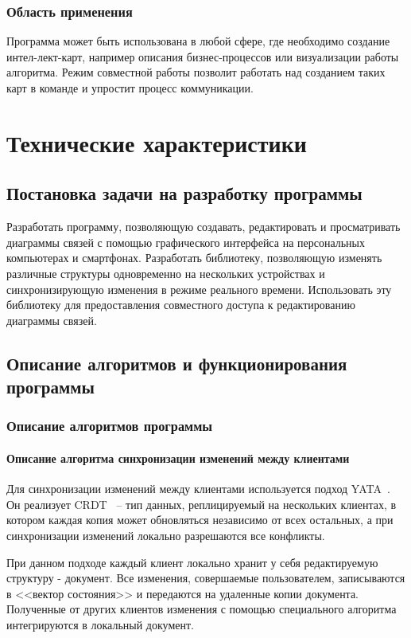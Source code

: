 \documentclass[a4paper,12pt]{article}
\begin{document}
    \subsubsection{Область применения}
    Программа может быть использована в любой сфере, где необходимо создание интел-лект-карт, например описания бизнес-процессов или визуализации работы алгоритма. Режим совместной работы позволит работать над созданием таких карт в команде и упростит процесс коммуникации.
    \newpage


    \section{Технические характеристики}

    \subsection{Постановка задачи на разработку программы}
    Разработать программу, позволяющую создавать, редактировать и просматривать диаграммы связей с помощью графического интерфейса на персональных компьютерах и смартфонах. Разработать библиотеку, позволяющую изменять различные структуры одновременно на нескольких устройствах и синхронизирующую изменения в режиме реального времени. Использовать эту библиотеку для предоставления совместного доступа к редактированию диаграммы связей.

    \subsection{Описание алгоритмов и функционирования программы}

    \subsubsection{Описание алгоритмов программы}

    \paragraph{Описание алгоритма синхронизации изменений между клиентами} \label{alg}
    Для синхронизации изменений между клиентами используется подход YATA~\cite{YATA}. Он реализует CRDT~\cite{CRDT} -- тип данных, реплицируемый на нескольких клиентах, в котором каждая копия может обновляться независимо от всех остальных, а при синхронизации изменений локально разрешаются все конфликты.

    При данном подходе каждый клиент локально хранит у себя редактируемую структуру - документ. Все изменения, совершаемые пользователем, записываются в <<вектор состояния>> и передаются на удаленные копии документа. Полученные от других клиентов изменения с помощью специального алгоритма интегрируются в локальный документ.
\end{document}

